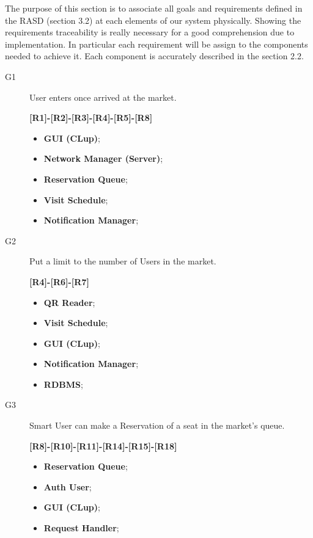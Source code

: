 The purpose of this section is to associate all goals and requirements defined in the RASD (section 3.2) at each elements of our system physically.
Showing the requirements traceability is really necessary for a good comprehension due to implementation.
In particular each requirement will be assign to the components needed to achieve it. 
Each component is accurately described in the section 2.2.


\begin{description}
    \item[G1]User enters once arrived at the market.\par
    \textbf{[R1]-[R2]-[R3]-[R4]-[R5]-[R8]}
    
    \begin{itemize}
        \item \textbf{GUI (CLup)}; 
        \item \textbf{Network Manager (Server)};  
        \item \textbf{Reservation Queue};
        \item \textbf{Visit Schedule};  
        \item \textbf{Notification Manager};  
        
    \end{itemize}
    
    \item[G2]Put a limit to the number of Users in the market.\par
    \textbf{[R4]-[R6]-[R7]}
    
    \begin{itemize}
        \item \textbf{QR Reader};
        \item \textbf{Visit Schedule};  
        \item \textbf{GUI (CLup)}; 
        \item \textbf{Notification Manager};  
        \item \textbf{RDBMS};
    \end{itemize}
    \pagebreak
        \item[G3]Smart User can make a Reservation of a seat in the market's queue.\par \textbf{[R8]-[R10]-[R11]-[R14]-[R15]-[R18]}
    \begin{itemize}
        \item \textbf{Reservation Queue};  
        \item \textbf{Auth User};  
        \item \textbf{GUI (CLup)};  
        \item \textbf{Request Handler}; 
    \end{itemize}
        

\end{description}
